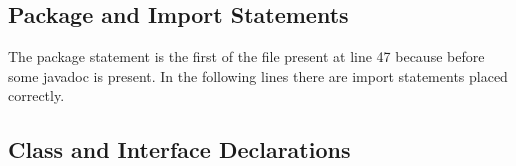 \documentclass[9pt]{beamer}
\makeatletter
\newcommand*{\currentname}{\@currentlabelname}
\makeatother
\begin{document}
\subsection{Package and Import Statements}

\begin{frame}{\currentname}
\begin{exampleblock}{}
The package statement is the first of the file present at line 47 because before some javadoc is present.
In the following lines there are import statements placed correctly.
\end{exampleblock}
\end{frame}

\subsection{Class and Interface Declarations}
\end{document}
